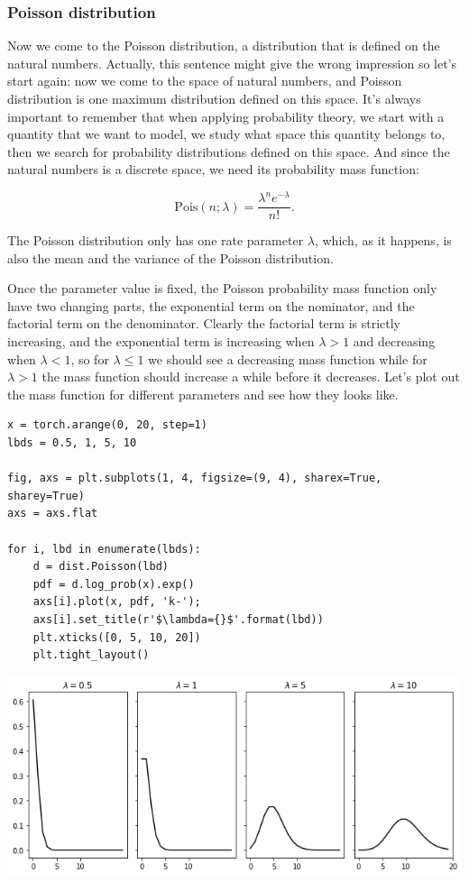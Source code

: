 \documentclass[11pt]{article}
\begin{document}
\subsubsection{Poisson distribution}
\label{sec:orgc69781d}

Now we come to the Poisson distribution, a distribution that is defined on the natural numbers. Actually, this sentence might give the wrong impression so let's start again: now we come to the space of natural numbers, and Poisson distribution is one maximum distribution defined on this space. It's always important to remember that when applying probability theory, we start with a quantity that we want to model, we study what space this quantity belongs to, then we search for probability distributions defined on this space. And since the natural numbers is a discrete space, we need its probability mass function:

$$\text{Pois}(n; \lambda) =  \frac{\lambda^n e^{-\lambda} }{n!}.$$

The Poisson distribution only has one rate parameter \(\lambda\), which, as it happens, is also the mean and the variance of the Poisson distribution.

Once the parameter value is fixed, the Poisson probability mass function only have two changing parts, the exponential term on the nominator, and the factorial term on the denominator. Clearly the factorial term is strictly increasing, and the exponential term is increasing when \(\lambda > 1\) and decreasing when \(\lambda < 1\), so for \(\lambda \leq 1\) we should see a decreasing mass function while for \(\lambda > 1\) the mass function should increase a while before it decreases. Let's plot out the mass function for different parameters and see how they looks like.

\begin{verbatim}
x = torch.arange(0, 20, step=1)
lbds = 0.5, 1, 5, 10

fig, axs = plt.subplots(1, 4, figsize=(9, 4), sharex=True, sharey=True)
axs = axs.flat

for i, lbd in enumerate(lbds):
    d = dist.Poisson(lbd)
    pdf = d.log_prob(x).exp()
    axs[i].plot(x, pdf, 'k-');
    axs[i].set_title(r'$\lambda={}$'.format(lbd))
    plt.xticks([0, 5, 10, 20])
    plt.tight_layout()
\end{verbatim}

\begin{center}
\includegraphics[width=.9\linewidth]{./.ob-jupyter/59dc2da23717c17b5ca70fd2f1a5a8138e0323d7.png}
\end{center}
\end{document}
